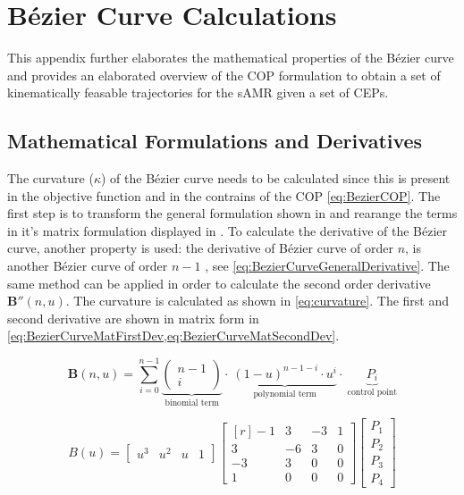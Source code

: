 \chapter{Bézier Curve Calculations} \label{app:BezierCurve}
\vspace{-2em}
This appendix further elaborates the mathematical properties of the Bézier curve and provides an elaborated overview of the COP formulation to obtain a set of kinematically feasable trajectories for the sAMR given a set of CEPs.

\section{Mathematical Formulations and Derivatives} \label{sec:BezierMathGen}
The curvature ($\kappa$) of the Bézier curve needs to be calculated since this is present in the objective function and in the contrains of the COP \cref{eq:BezierCOP}. The first step is to transform the general formulation shown in  and rearange the terms in it's matrix formulation displayed in . To calculate the derivative of the Bézier curve, another property is used:  the derivative of Bézier curve of order $n$, is another Bézier curve of order $n-1$ \cite{Sederberg2016}, see \cref{eq:BezierCurveGeneralDerivative}. The same method can be applied in order to calculate the second order derivative $\bm{B}''(n,u)$. The curvature is calculated as shown in \cref{eq:curvature}. The first and second derivative are shown in matrix form in \cref{eq:BezierCurveMatFirstDev,eq:BezierCurveMatSecondDev}.

\begin{equation} 
\bm{B}(n,u) = \sum_{i=0}^{n-1}
\underbrace{ \begin{pmatrix} n-1 \\ i \end{pmatrix}}_\text{binomial term} \cdot~
\underbrace{(1-u)^{n-1-i} \cdot u^i}_\text{polynomial term}
\cdot~\underbrace{ P_i}_\text{control point}
\label{eq:BezierCurveGeneralApp}
\end{equation}

\begin{equation}
B(u) =
\begin{bmatrix}
u^3 & u^2 & u & 1  
\end{bmatrix}
\begin{bmatrix*}[r]
-1 &  3 & -3 & 1\\ 
 3 & -6 &  3 & 0\\ 
-3 &  3 &  0 & 0\\ 
 1 &  0 &  0 & 0 
\end{bmatrix*}
\begin{bmatrix}
P_1  \\ P_2 \\ P_3 \\ P_4 
\end{bmatrix} \label{eq:BezierCurveMat}
\end{equation}

